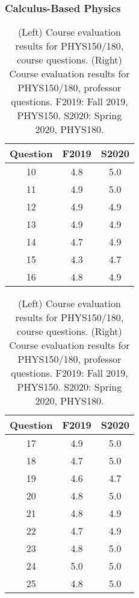 \documentclass[../../main.tex]{subfiles}
\begin{document}
\subsubsection{Calculus-Based Physics}

\begin{table}
\footnotesize
\centering
\begin{tabular}{| c | c | c |}
\hline
\hline
Question & F2019 & S2020 \\ \hline
10 & 4.8 & 5.0 \\ \hline
11 & 4.9 & 5.0 \\ \hline
12 & 4.9 & 4.9 \\ \hline
13 & 4.9 & 4.9 \\ \hline
14 & 4.7 & 4.9 \\ \hline
15 & 4.3 & 4.7 \\ \hline
16 & 4.8 & 4.9 \\ \hline
\hline
\end{tabular}
\begin{tabular}{| c | c | c |}
\hline
\hline
Question & F2019 & S2020 \\ \hline
17 & 4.9 & 5.0 \\ \hline
18 & 4.7 & 5.0 \\ \hline
19 & 4.6 & 4.7 \\ \hline
20 & 4.8 & 5.0 \\ \hline
21 & 4.8 & 4.9 \\ \hline
22 & 4.7 & 4.9 \\ \hline
23 & 4.8 & 5.0 \\ \hline
24 & 5.0 & 5.0 \\ \hline
25 & 4.8 & 5.0 \\ \hline
\hline
\end{tabular}
\caption{\label{tab:eval_150_180} (Left) Course evaluation results for PHYS150/180, course questions.  (Right) Course evaluation results for PHYS150/180, professor questions.  F2019: Fall 2019, PHYS150.  S2020: Spring 2020, PHYS180.}
\end{table}
\end{document}
